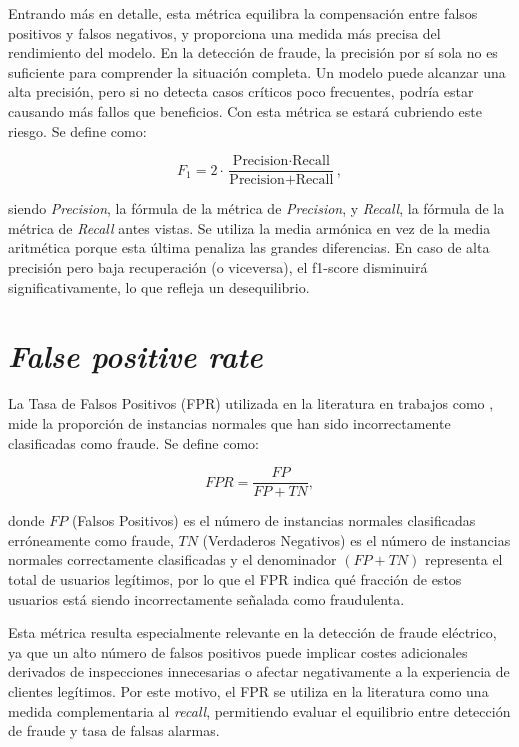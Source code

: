 \documentclass[12pt,a4paper]{report}
\begin{document}
Entrando más en detalle, esta métrica equilibra la compensación entre falsos positivos y falsos negativos, y proporciona una medida más precisa del rendimiento del modelo. En la detección de fraude, la precisión por sí sola no es suficiente para comprender la situación completa. Un modelo puede alcanzar una alta precisión, pero si no detecta casos críticos poco frecuentes, podría estar causando más fallos que beneficios. Con esta métrica se estará cubriendo este riesgo. Se define como:

\[
F_1 = 2 \cdot \frac{\text{Precision} \cdot \text{Recall}}{\text{Precision} + \text{Recall}}
,\]

\noindent siendo \emph{Precision}, la fórmula de la métrica de \emph{Precision}, y \emph{Recall}, la fórmula de la métrica de \emph{Recall} antes vistas. Se utiliza la media armónica en vez de la media aritmética porque esta última penaliza las grandes diferencias. En caso de alta precisión pero baja recuperación (o viceversa), el f1-score disminuirá significativamente, lo que refleja un desequilibrio.


\section{\emph{False positive rate}}

La Tasa de Falsos Positivos (FPR) utilizada en la literatura en trabajos como \cite{articuloBase}, mide la proporción de instancias normales que han sido incorrectamente clasificadas como fraude. Se define como:

\[
FPR = \frac{FP}{FP + TN}
,\]

\noindent donde $FP$ (Falsos Positivos) es el número de instancias normales clasificadas erróneamente como fraude, $TN$ (Verdaderos Negativos) es el número de instancias normales correctamente clasificadas y el denominador $(FP + TN)$ representa el total de usuarios legítimos, por lo que el FPR indica qué fracción de estos usuarios está siendo incorrectamente señalada como fraudulenta.

Esta métrica resulta especialmente relevante en la detección de fraude eléctrico, ya que un alto número de falsos positivos puede implicar costes adicionales derivados de inspecciones innecesarias o afectar negativamente a la experiencia de clientes legítimos. Por este motivo, el FPR se utiliza en la literatura como una medida complementaria al \emph{recall}, permitiendo evaluar el equilibrio entre detección de fraude y tasa de falsas alarmas.
\end{document}

